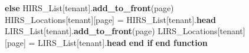 \begin{figure}[htbp]
\begin{minipage}{\linewidth}
\begin{algorithm}[H]
\begin{algorithmic}
            \STATE \hspace{\algorithmicindent} \textbf{else}
            \STATE \hspace{\algorithmicindent} \hspace{\algorithmicindent} HIRS\_List[tenant].\textbf{add\_to\_front}(page)
            \STATE \hspace{\algorithmicindent} \hspace{\algorithmicindent} HIRS\_Locations[tenant][page] = HIRS\_List[tenant].\textbf{head}
            \STATE \hspace{\algorithmicindent} \hspace{\algorithmicindent} LIRS\_List[tenant].\textbf{add\_to\_front}(page) 
            \STATE \hspace{\algorithmicindent} \hspace{\algorithmicindent} LIRS\_Locations[tenant][page] = LIRS\_List[tenant].\textbf{head}
            \STATE \hspace{\algorithmicindent} \textbf{end if}
            \STATE \textbf{end function}


\end{algorithmic}
\end{algorithm}
\end{minipage}
\end{figure}
